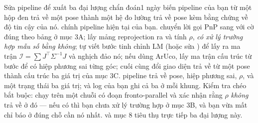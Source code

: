\documentclass[../../marker.tex]{subfiles}
\begin{document}
\begin{ungdung}
\end{ungdung}

\begin{duan}{Sửa pipeline để xuất ba đại lượng chẩn đoán}{1 ngày}
\dmt biến pipeline của bạn từ một hộp đen trả về một pose thành một hệ đo lường trả về pose kèm bằng chứng về độ tin cậy của nó.
\ddl chính pipeline hiện tại của bạn.
\dbc chuyển lời gọi PnP sang  với cờ đúng theo bảng ở mục 3A; lấy mảng reprojection ra và tính \(\rho\), \emph{có xử lý trường hợp mẫu số bằng không}; tự viết bước tinh chỉnh LM (hoặc sửa ) để lấy ra ma trận \(\mathcal{I} = \sum J^\top\Sigma^{-1}J\) và nghịch đảo nó; nếu dùng ArUco, lấy ma trận cấu trúc từ bước  để có hiệp phương sai từng góc; cuối cùng đổi giao diện trả về từ một pose thành cấu trúc ba giá trị của  mục 3C.
\dxk pipeline trả về pose, hiệp phương sai, \(\rho\), và một trạng thái ba giá trị; và log của bạn ghi cả ba ở mỗi khung. Kiểm tra chéo bắt buộc: chạy trên một chuỗi có đoạn fronto-parallel và xác nhận rằng \(\rho\) \emph{không} trả về  ở đó --- nếu có thì bạn chưa xử lý trường hợp ở mục 3B, và bạn vừa mất chỉ báo ở đúng chỗ cần nó nhất.
\dnv {} và  mục 8 tiêu thụ trực tiếp ba đại lượng này.
\end{duan}
\end{document}
